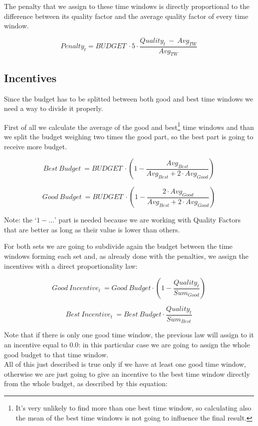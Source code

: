 \documentclass[10pt, letterpaper]{article}
\begin{document}
The penalty that we assign to these time windows is directly proportional to the
difference between its quality factor and the average quality factor of every
time window.

\[Penalty_{t} = BUDGET\ \cdot 
				5 \cdot 
				\frac{Quality_{t}\ -\ Avg_{TW}}{Avg_{TW}}
\]


\subsection{Incentives}
Since the budget has to be splitted between both good and best time windows we
need a way to divide it properly.

First of all we calculate the average of the good and best\footnote{It's very
unlikely to find more than one best time window, so calculating also the mean of
the best time windows is not going to influence the final result.} time windows
and than we split the budget weighing two times the good part, so the
best part is going to receive more budget.

\[Best\ Budget\ = BUDGET\ \cdot 
				  \left( 1 - \frac
								{ Avg_{Best} }
								{ Avg_{Best} + 2 \cdot Avg_{Good} }
				  \right)
\]

\[Good\ Budget\ = BUDGET\ \cdot 
				  \left( 1 - \frac
								{ 2 \cdot Avg_{Good} }
								{ Avg_{Best} + 2 \cdot Avg_{Good} }
				  \right)
\]

Note: the `$1 - \ldots$' part is needed because we are working with Quality
Factors that are better as long as their value is lower than others.

For both sets we are going to subdivide again the budget between the time
windows forming each set and, as already done with the penalties, we assign the
incentives with a direct proportionality law:

\[Good\ Incentive_{t}\ = Good\ Budget \cdot
						 \left(
							 1 - \frac{Quality_{t}}{Sum_{Good}}
						 \right)
\]

\[Best\ Incentive_{t}\ = Best\ Budget \cdot \frac{Quality_{t}}{Sum_{Best}}
\]

Note that if there is only one good time window, the previous law will assign to
it an incentive equal to $0.0$: in this particular case we are going to
assign the whole good budget to that time window. \\

All of this just described is true only if we have at least one good time
window, otherwise we are just going to give an incentive to the best time window
directly from the whole budget, as described by this equation:
\end{document}
